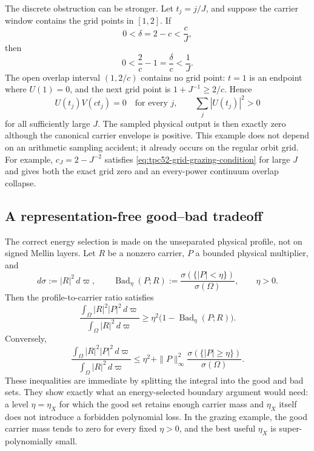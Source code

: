 The discrete obstruction can be stronger.  Let \(t_j=j/J\), and
suppose the carrier window contains the grid points in \([1,2]\).  If
\begin{equation}
 0<\delta=2-c<\frac cJ,
 \label{eq:tpc52-grid-grazing-condition}
\end{equation}
then
\[
 0<\frac2c-1=\frac\delta c<\frac1J.
\]
The open overlap interval \((1,2/c)\) contains no grid point: \(t=1\)
is an endpoint where \(U(1)=0\), and the next grid point is
\(1+J^{-1}\geq2/c\).  Hence
\begin{equation}
 U(t_j)V(ct_j)=0
 \quad\text{for every }j,
 \qquad
 \sum_j|U(t_j)|^2>0
 \label{eq:tpc52-exact-grid-zero}
\end{equation}
for all sufficiently large \(J\).  The sampled physical output is then
exactly zero although the canonical carrier envelope is positive.
This example does not depend on an arithmetic sampling accident; it
already occurs on the regular orbit grid.
For example, \(c_J=2-J^{-2}\) satisfies
\eqref{eq:tpc52-grid-grazing-condition} for large \(J\) and gives both
the exact grid zero and an every-power continuum overlap collapse.

\subsection{A representation-free good--bad tradeoff}

The correct energy selection is made on the unseparated physical
profile, not on signed Mellin layers.  Let \(R\) be a nonzero carrier,
\(P\) a bounded physical multiplier, and
\begin{equation}
 d\sigma:=|R|^2\,d\varpi,
 \qquad
 \operatorname{Bad}_\eta(P;R)
 :=\frac{\sigma(\{|P|<\eta\})}{\sigma(\Omega)},
 \qquad \eta>0.
 \label{eq:tpc52-bad-carrier-fraction}
\end{equation}
Then the profile-to-carrier ratio satisfies
\begin{equation}
 \frac{\int_\Omega|R|^2|P|^2\,d\varpi}
      {\int_\Omega|R|^2\,d\varpi}
 \geq
 \eta^2\bigl(1-\operatorname{Bad}_\eta(P;R)\bigr).
 \label{eq:tpc52-good-bad-lower-tradeoff}
\end{equation}
Conversely,
\begin{equation}
 \frac{\int_\Omega|R|^2|P|^2\,d\varpi}
      {\int_\Omega|R|^2\,d\varpi}
 \leq
 \eta^2+\|P\|_\infty^2
 \frac{\sigma(\{|P|\geq\eta\})}{\sigma(\Omega)}.
 \label{eq:tpc52-good-bad-upper-tradeoff}
\end{equation}
These inequalities are immediate by splitting the integral into the
good and bad sets.  They show exactly what an energy-selected boundary
argument would need: a level \(\eta=\eta_X\) for which the good set
retains enough carrier mass and \(\eta_X\) itself does not introduce a
forbidden polynomial loss.  In the grazing example, the good carrier
mass tends to zero for every fixed \(\eta>0\), and the best useful
\(\eta_X\) is super-polynomially small.

